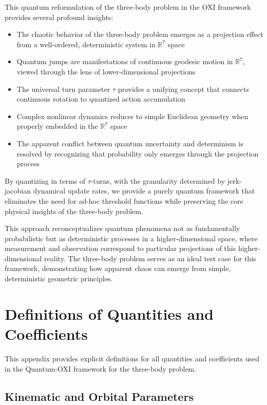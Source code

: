 \documentclass{article}
\begin{document}
This quantum reformulation of the three-body problem in the OXI framework provides several profound insights:

\begin{itemize}
\item The chaotic behavior of the three-body problem emerges as a projection effect from a well-ordered, deterministic system in $\mathbb{R}^7$ space
\item Quantum jumps are manifestations of continuous geodesic motion in $\mathbb{R}^7$, viewed through the lens of lower-dimensional projections
\item The universal turn parameter $\tau$ provides a unifying concept that connects continuous rotation to quantized action accumulation
\item Complex nonlinear dynamics reduces to simple Euclidean geometry when properly embedded in the $\mathbb{R}^7$ space
\item The apparent conflict between quantum uncertainty and determinism is resolved by recognizing that probability only emerges through the projection process
\end{itemize}

By quantizing in terms of $\tau$-turns, with the granularity determined by jerk-jacobian dynamical update rates, we provide a purely quantum framework that eliminates the need for ad-hoc threshold functions while preserving the core physical insights of the three-body problem.

This approach reconceptualizes quantum phenomena not as fundamentally probabilistic but as deterministic processes in a higher-dimensional space, where measurement and observation correspond to particular projections of this higher-dimensional reality. The three-body problem serves as an ideal test case for this framework, demonstrating how apparent chaos can emerge from simple, deterministic geometric principles.

\appendix
\section{Definitions of Quantities and Coefficients}
\label{appendix:definitions}

This appendix provides explicit definitions for all quantities and coefficients used in the Quantum-OXI framework for the three-body problem.

\subsection{Kinematic and Orbital Parameters}
\end{document}
